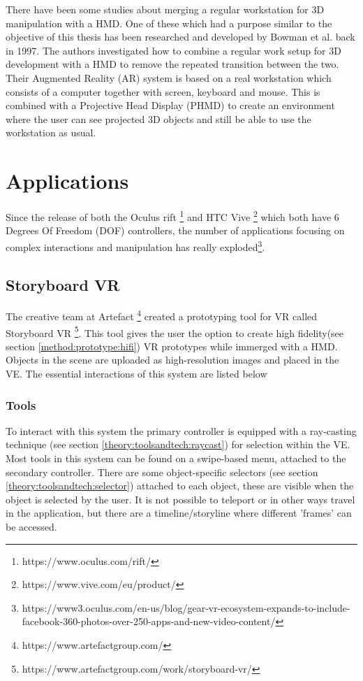 There have been some studies about merging a regular workstation for 3D manipulation with a HMD. One of these which had a purpose similar to the objective of this thesis has been researched and developed by Bowman et al. back in 1997. \cite{relatedwork:kijimaand1997transition} The authors investigated how to combine a regular work setup for 3D development with a HMD to remove the repeated transition between the two. Their Augmented Reality (AR) system is based on a real workstation which consists of a computer together with screen, keyboard and mouse. This is combined with a Projective Head Display (PHMD) to create an environment where the user can see projected 3D objects and still be able to use the workstation as usual.
\section{Applications}
Since the release of both the Oculus rift \footnote{https://www.oculus.com/rift/} and HTC Vive \footnote{https://www.vive.com/eu/product/} which both have 6 Degrees Of Freedom (DOF) controllers, the number of applications focusing on complex interactions and manipulation has really exploded\footnote{https://www3.oculus.com/en-us/blog/gear-vr-ecosystem-expands-to-include-facebook-360-photos-over-250-apps-and-new-video-content/}.
\subsection{Storyboard VR}
The creative team at Artefact \footnote{https://www.artefactgroup.com/} created a prototyping tool for VR called Storyboard VR \footnote{https://www.artefactgroup.com/work/storyboard-vr/}. This tool gives the user the option to create high fidelity(see section \ref{method:prototype:hifi})  VR prototypes while immerged with a HMD. Objects in the scene are uploaded as high-resolution images and placed in the VE. The essential interactions of this system are listed below
\subsubsection{Tools}
To interact with this system the primary controller is equipped with a ray-casting technique (see section \ref{theory:toolsandtech:raycast}) for selection within the VE.
Most tools in this system can be found on a swipe-based menu, attached to the secondary controller. There are some object-specific selectors (see section \ref{theory:toolsandtech:selector}) attached to each object, these are visible when the object is selected by the user. It is not possible to teleport or in other ways travel in the application, but there are  a timeline/storyline where different 'frames' can be accessed.

